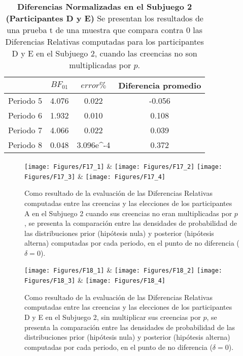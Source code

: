 \begin{table}[h]
\caption[Diferencias Relativas en el Subjuego 2, omitiendo la multiplicación por $p$; Participantes D y E (Pruebas t de una muestra)]{\textbf{Diferencias Normalizadas en el Subjuego 2 (Participantes D y E)} Se presentan los resultados de una prueba t de una muestra que compara contra 0 las Diferencias Relativas computadas para los participantes D y E en el Subjuego 2, cuando las creencias no son multiplicadas por $p$.}
\label{DRnop-S2-DyE-B}
\centering
\begin{tabular}{l | c c | c}
\toprule
\textbf{} & \textbf{$BF_{01}$} & \textbf{$error\%$} & \textbf{Diferencia promedio}\\
\midrule
Periodo 5 & 4.076 & 0.022 & -0.056\\
Periodo 6 & 1.932 & 0.010 & 0.108\\
Periodo 7 & 4.066 & 0.022 & 0.039\\
Periodo 8 & 0.048 & 3.096e^-4 & 0.372\\
\bottomrule
\end{tabular}
\end{table}
  

\begin{figure}[h]
\centering
\texttt{[image: Figures/F17\_1]} & \texttt{[image: Figures/F17\_2]} 
\texttt{[image: Figures/F17\_3]} & \texttt{[image: Figures/F17\_4]} 
\decoRule
\caption[Evaluación de las Diferencias Relativas entre creencias (omitiendo la multiplicación por $p$) y elecciones en los participantes A en el Subjuego 2 (Factor de Bayes)]{Como resultado de la evaluación de las Diferencias Relativas computadas entre las creencias y las elecciones de los participantes A en el Subjuego 2 cuando sus creencias no eran multiplicadas por $p$, se presenta la comparación entre las densidades de probabilidad de las distribuciones prior (hipótesis nula) y posterior (hipótesis alterna) computadas por cada periodo, en el punto de no diferencia ($\delta = 0$).}
\label{fig:DRnop_S2_A}
\end{figure}  


\begin{figure}[h]
\centering
\texttt{[image: Figures/F18\_1]} & \texttt{[image: Figures/F18\_2]} 
\texttt{[image: Figures/F18\_3]} & \texttt{[image: Figures/F18\_4]} 
\decoRule
\caption[Evaluación de las Diferencias Relativas entre creencias (omitiendo la multiplicación por $p$) y elecciones en los participantes D y E en el Subjuego 2 (Factor de Bayes)]{Como resultado de la evaluación de las Diferencias Relativas computadas entre las creencias y las elecciones de los participantes D y E en el Subjuego 2, sin multiplicar sus creencias por $p$, se presenta la comparación entre las densidades de probabilidad de las distribuciones prior (hipótesis nula) y posterior (hipótesis alterna) computadas por cada periodo, en el punto de no diferencia ($\delta = 0$).}
\label{fig:DRnop_S2_DyE}
\end{figure}  

